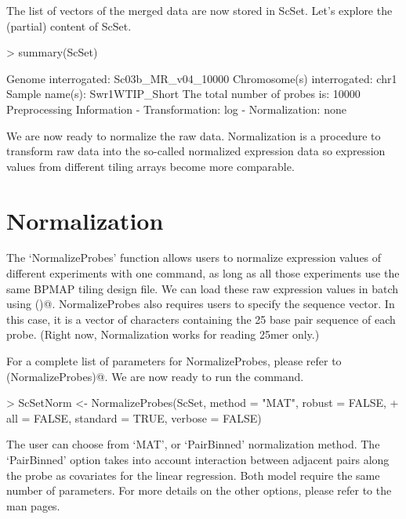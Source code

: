 \documentclass[11pt]{article}
\begin{document}
The list of vectors of the merged data are now stored in ScSet.
Let's explore the (partial) content of ScSet.

\begin{Schunk}
\begin{Sinput}
> summary(ScSet)
\end{Sinput}
\begin{Soutput}
   Genome interrogated:  Sc03b_MR_v04_10000  
   Chromosome(s) interrogated: chr1 
   Sample name(s):  Swr1WTIP_Short  
   The total number of probes is:  10000  
   Preprocessing Information 
     - Transformation: log 
     - Normalization: none 
\end{Soutput}
\end{Schunk}

We are now ready to normalize the raw data. Normalization is a procedure to transform raw data into the so-called normalized expression data so expression values from different tiling arrays become more comparable.

\part{Normalization}
The `NormalizeProbes' function allows users to normalize expression values of different experiments with one command, as long as all those experiments use the same BPMAP tiling design file. We can load these raw expression values in batch using \verb@cbind()@. NormalizeProbes also requires users to specify the sequence vector. In this case, it is a vector of characters containing the 25 base pair sequence of each probe.  (Right now, Normalization works for reading 25mer only.)

For a complete list of parameters for NormalizeProbes, please refer to 
\newline
\verb@help(NormalizeProbes)@.	
	We are now ready to run the command.

\begin{Schunk}
\begin{Sinput}
> ScSetNorm <- NormalizeProbes(ScSet, method = "MAT", robust = FALSE, 
+     all = FALSE, standard = TRUE, verbose = FALSE)
\end{Sinput}
\end{Schunk}

The user can choose from `MAT', or `PairBinned' normalization method. The `PairBinned' option takes into account interaction between adjacent pairs along the probe as covariates for the linear regression. Both model require the same number of parameters. For more details on the other options, please refer to the man pages.
\end{document}
